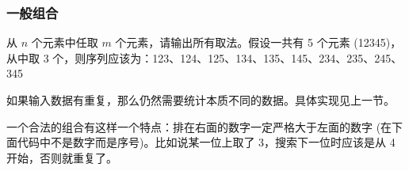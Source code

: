 \subsubsection{一般组合}
	从 $n$ 个元素中任取 $m$ 个元素，请输出所有取法。假设一共有 5 个元素 (12345)，从中取 3 个，则序列应该为：123、124、125、134、135、145、234、235、245、345
	
	如果输入数据有重复，那么仍然需要统计本质不同的数据。具体实现见上一节。
	
	一个合法的组合有这样一个特点：排在右面的数字一定严格大于左面的数字 (在下面代码中不是数字而是序号)。比如说某一位上取了 3，搜索下一位时应该是从 4 开始，否则就重复了。
	
	